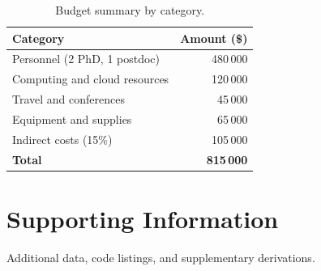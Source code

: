 \documentclass[
    language=english,
    doctype=research-proposal,
    institution=none,
    titlestyle=book,
]{../../omnilatex}
\begin{document}
\begin{table}[htbp]
    \centering
    \caption{Budget summary by category.}
    \label{tab:budget}
    \begin{tabular}{@{}lr@{}}
        \toprule
        Category & Amount (\$) \\
        \midrule
        Personnel (2 PhD, 1 postdoc)  & 480\,000 \\
        Computing and cloud resources & 120\,000 \\
        Travel and conferences        &  45\,000 \\
        Equipment and supplies        &  65\,000 \\
        Indirect costs (15\%)         & 105\,000 \\
        \midrule
        \textbf{Total}               & \textbf{815\,000} \\
        \bottomrule
    \end{tabular}
\end{table}

\appendix
\chapter{Supporting Information}
Additional data, code listings, and supplementary derivations.

\printbibliography
\end{document}
